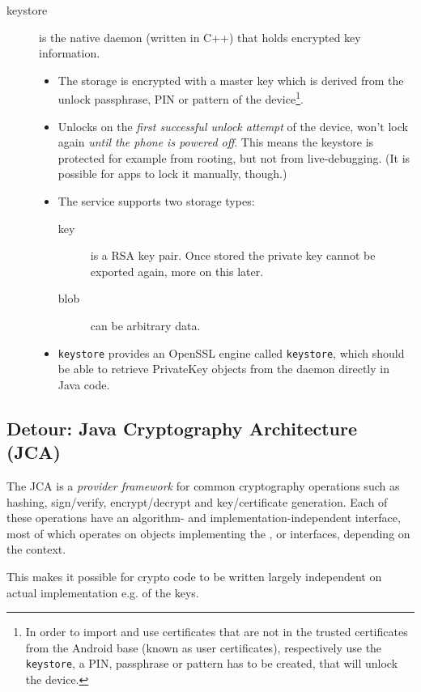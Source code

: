 \documentclass[a4paper,bibtotoc,draft]{scrartcl}
\begin{document}
\begin{description}
		\item[keystore] is the native daemon (written in C++) that holds encrypted key information.
			\begin{itemize}
				\item The storage is encrypted with a master key which is derived from the unlock passphrase, PIN or pattern of the device\footnote{In order to import and use certificates that are not in the trusted certificates from the Android base (known as user certificates), respectively use the \texttt{keystore}, a PIN, passphrase or pattern has to be created, that will unlock the device.}.
				\item Unlocks on the \emph{first successful unlock attempt} of the device, won't lock again \emph{until the phone is powered off}. This means the keystore is protected for example from rooting, but not from live-debugging. (It is possible for apps to lock it manually, though.)
				\item The service supports two storage types:
				\begin{description}
					\item[key] is a RSA key pair. Once stored the private key cannot be exported again, more on this later.
					\item[blob] can be arbitrary data.
				\end{description}
				\item \texttt{keystore} provides an OpenSSL engine called \texttt{keystore}, which should be able to retrieve PrivateKey objects from the daemon directly in Java code.
			\end{itemize}
	\end{description}

	\subsection*{Detour: Java Cryptography Architecture (JCA)}
		The JCA is a {\em provider framework} for common cryptography operations such as hashing, sign/verify, encrypt/decrypt and key/certificate generation. Each of these operations have an algorithm- and implementation-independent interface, most of which operates on objects implementing the ,  or  interfaces, depending on the context.

		This makes it possible for crypto code to be written largely independent on actual implementation e.g. of the keys.
\end{document}
